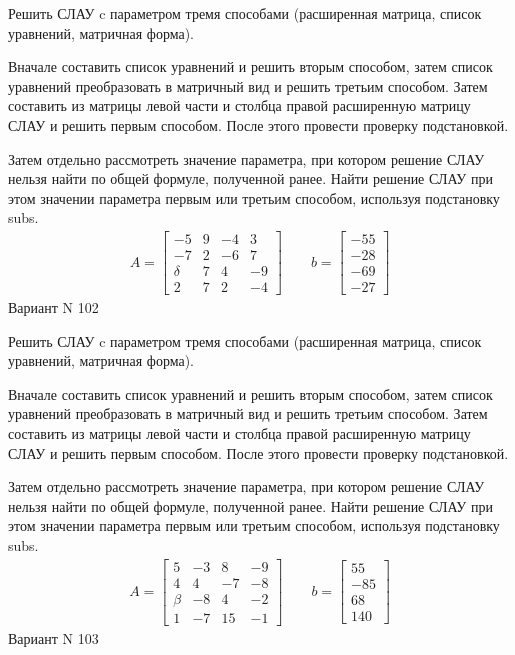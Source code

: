 \documentclass[11pt]{report}
\begin{document}
Решить СЛАУ c параметром тремя способами (расширенная матрица, список уравнений, матричная форма).

Вначале составить список уравнений и решить вторым способом,
затем список уравнений преобразовать в матричный вид и решить третьим способом.
Затем составить из матрицы левой части и столбца правой расширенную матрицу СЛАУ и решить первым способом.
После этого провести проверку подстановкой.

Затем отдельно рассмотреть значение параметра, при котором решение СЛАУ нельзя найти по общей формуле,
полученной ранее.
Найти решение СЛАУ при этом значении параметра первым или третьим способом, используя подстановку subs.
\begin{align*}
    A = \left[\begin{matrix}-5 & 9 & -4 & 3\\-7 & 2 & -6 & 7\\\delta & 7 & 4 & -9\\2 & 7 & 2 & -4\end{matrix}\right]
\qquad b = \left[\begin{matrix}-55\\-28\\-69\\-27\end{matrix}\right]
\end{align*}
\newpage
Вариант N 102


Решить СЛАУ c параметром тремя способами (расширенная матрица, список уравнений, матричная форма).

Вначале составить список уравнений и решить вторым способом,
затем список уравнений преобразовать в матричный вид и решить третьим способом.
Затем составить из матрицы левой части и столбца правой расширенную матрицу СЛАУ и решить первым способом.
После этого провести проверку подстановкой.

Затем отдельно рассмотреть значение параметра, при котором решение СЛАУ нельзя найти по общей формуле,
полученной ранее.
Найти решение СЛАУ при этом значении параметра первым или третьим способом, используя подстановку subs.
\begin{align*}
    A = \left[\begin{matrix}5 & -3 & 8 & -9\\4 & 4 & -7 & -8\\\beta & -8 & 4 & -2\\1 & -7 & 15 & -1\end{matrix}\right]
\qquad b = \left[\begin{matrix}55\\-85\\68\\140\end{matrix}\right]
\end{align*}
\newpage
Вариант N 103
\end{document}
